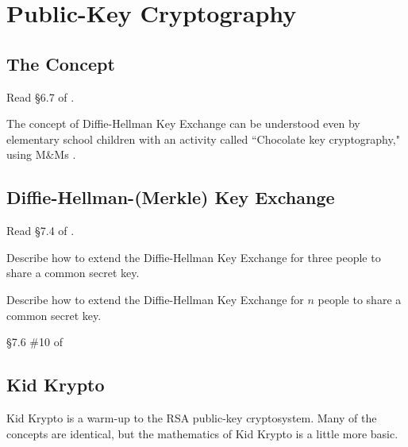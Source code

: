 \chapter{Public-Key Cryptography}
\label{ch:pkc}
	\section{The Concept}

	Read \S 6.7 of \cite{tw}.

The concept of Diffie-Hellman Key Exchange can be understood even by elementary school children with an activity called ``Chocolate key cryptography," using M\&Ms \cite{mandm}.



	\section{Diffie-Hellman-(Merkle) Key Exchange}

Read \S 7.4 of \cite{tw}.

\begin{problem}[15 points]
	Describe how to extend the Diffie-Hellman Key Exchange for three people to share a common secret key.
\end{problem}

\begin{problem}[15 points]
	Describe how to extend the Diffie-Hellman Key Exchange for $n$ people to share a common secret key.
\end{problem}

\begin{problem}[15 points]
	\S 7.6 \#10 of \cite {tw}
\end{problem}

	\section{Kid Krypto}

	Kid Krypto  is a warm-up to the RSA public-key cryptosystem. Many of the concepts are identical, but the mathematics of Kid Krypto is a little more basic.

